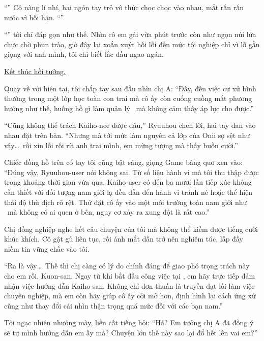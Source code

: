 \documentclass[../main.tex]{subfiles}
\begin{document}
``'' Cô nàng lí nhí, hai ngón tay trỏ vô thức chọc chọc vào nhau, mắt rấn rấn nước vì hối hận. ``''

``'' tôi chỉ đáp gọn như thế. Nhìn cô em gái vừa phút trước còn như ngọn núi lửa chực chờ phun trào, giờ đây lại xoắn xuýt hối lỗi đến mức tội nghiệp chỉ vì lỡ gằn giọng với anh mình, tôi chỉ biết lắc đầu ngao ngán.

\begin{center}
  \uline{Kết thúc hồi tưởng.}
\end{center}

Quay về với hiện tại, tôi chắp tay sau đầu nhìn chị A: ``Đấy, đến việc cư xử bình thường trong một lớp học toàn con trai mà cô ấy còn cuống cuồng mất phương hướng như thế, huống hồ gì làm quản lý \hls\ mà không cảm thấy áp lực cho được.''

``Cũng không thể trách Kaiho-nee được đâu,'' Ryuuhou chen lời, hai tay đan vào nhau đặt trên bàn. ``Nhưng mà tới mức làm nguyên cả lớp của Onii sợ sệt như vậy\dots\ rồi xin lỗi rối rít anh trai mình, em mừng tượng mà thấy buồn cười.''

Chiếc đồng hồ trên cổ tay tôi cũng bật sáng, giọng Game bâng quơ xen vào: ``Đúng vậy, Ryuuhou-user nói không sai. Từ số liệu hành vi mà tôi thu thập được trong khoảng thời gian vừa qua, Kaiho-user có đến ba mươi lần tiếp xúc không cần thiết với đối tượng nam giới lạ đều dẫn đến hành vi tránh né hoặc thể hiện thái độ thù địch rõ rệt. Thử đặt cô ấy vào một môi trường toàn nam giới như \hls\ mà không có ai quen ở bên, nguy cơ xảy ra xung đột là rất cao.''

Chị đồng nghiệp nghe hết câu chuyện của tôi mà không thể kiềm được tiếng cười khúc khích. Cô gật gù liên tục, rồi ánh mắt dần trở nên nghiêm túc, lấp đầy niềm tin vững chắc vào tôi.

``Ra là vậy\dots\ Thế thì chị càng có lý do chính đáng để giao phó trọng trách này cho em rồi, Kuon-san. Ngay từ khi bắt đầu công việc tại \hls, em hãy trực tiếp đảm nhận việc hướng dẫn Kaiho-san. Không chỉ đơn thuần là truyền đạt lối làm việc chuyên nghiệp, mà em còn hãy giúp cô ấy cởi mở hơn, định hình lại cách ứng xử cũng như thay đổi cái nhìn thận trọng quá mức đối với các bạn nam.''

Tôi ngạc nhiên nhướng mày, liền cất tiếng hỏi: ``Hả? Em tưởng chị A đã đồng ý sẽ tự mình hướng dẫn em ấy mà? Chuyện lớn thế này sao lại đổ hết lên vai em?''
\end{document}
